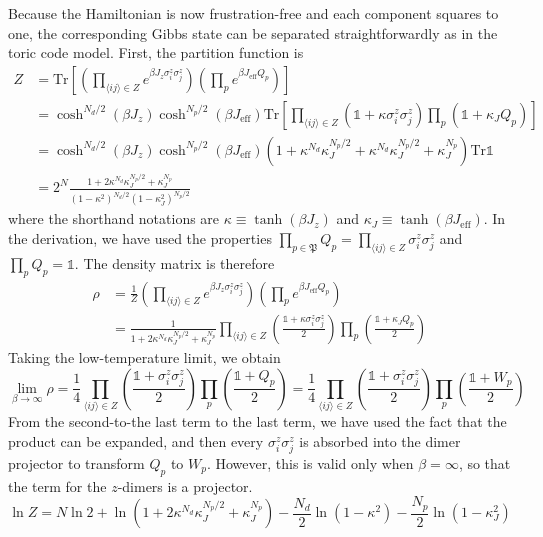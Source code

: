 \documentclass[12font]{article}
\numberwithin{equation}{section}    %
\theoremstyle{definition}
\newcommand{\anglelr}[1]{\langle #1 \rangle}
\newcommand{\lr}[1]{\left(  #1  \right)}
\newcommand{\lrm}[1]{\left[  #1  \right]}
\newcommand{\mrm}[1]{\mathrm{#1}}
\newcommand{\Tr}{\mrm{Tr}}
\begin{document}
Because the Hamiltonian is now frustration-free and each component squares to one, the corresponding Gibbs state can be separated straightforwardly as in the toric code model. First, the partition function is
\begin{align}
    Z 
    &= 
    \Tr
    \lrm{
    \lr{\prod_{\anglelr{ij}\in Z} e^{\beta J_z \sigma^z_i\sigma^z_j}}
    \lr{\prod_p e^{\beta J_{\mrm{eff}} Q_p}} 
    } \nonumber \\
    &= 
    \cosh^{N_d/2}(\beta J_z )
    \cosh^{N_p/2}(\beta J_{\mrm{eff}})
    \Tr\lrm{
    \prod_{\anglelr{ij}\in Z} \lr{\mathds{1} + \kappa \sigma^z_i\sigma^z_j}
    \prod_{p} \lr{\mathds{1} + \kappa_J Q_p} 
    } \nonumber \\
    &=
    \cosh^{N_d/2}(\beta J_z )
    \cosh^{N_p/2}(\beta J_{\mrm{eff}})
    \lr{
    1 + \kappa^{N_d}\kappa_J^{N_p/2} + \kappa^{N_d}\kappa_J^{N_p/2} + \kappa_J^{N_p}
    }
    \Tr\mathds{1} \nonumber \\
    &=
    2^N
    \frac
    {1 + 2\kappa^{N_d}\kappa_J^{N_p/2} +  \kappa_J^{N_p}}
    {\lr{1 - \kappa^2}^{N_d/2} \lr{1 - \kappa_J^2}^{N_p/2}}
\end{align}
where the shorthand notations are $\kappa \equiv \tanh(\beta J_z )$ and $\kappa_J \equiv \tanh(\beta J_{\mrm{eff}})$. In the derivation, we have used the properties $\prod_{p\in\mathfrak{P}} Q_p = \prod_{\anglelr{ij}\in Z}\sigma^z_i\sigma^z_j$ and $\prod_{p}Q_p = \mathds{1}$. The density matrix is therefore
\begin{align}\label{eq:kitaev-DM-finite-T}
    \rho 
    &= 
    \frac{1}{Z} \lr{\prod_{\anglelr{ij}\in Z} e^{\beta J_z \sigma^z_i\sigma^z_j}}
    \lr{\prod_p e^{\beta J_{\mrm{eff}} Q_p}} \nonumber \\
    &=
    \frac{1}{1 + 2\kappa^{N_d}\kappa_J^{N_p/2} + \kappa_J^{N_p}}
    \prod_{\anglelr{ij} \in Z} \lr{\frac{\mathds{1} + \kappa \sigma^z_i\sigma^z_j}{2}}
    \prod_{p}\lr{\frac{\mathds{1} + \kappa_J Q_p}{2}} 
\end{align}
Taking the low-temperature limit, we obtain
\[
\lim_{\beta\to\infty}\rho
=
\frac{1}{4}\prod_{\anglelr{ij} \in Z} \lr{\frac{\mathds{1} + \sigma^z_i\sigma^z_j}{2}}
    \prod_{p}\lr{\frac{\mathds{1} + Q_p}{2}} 
=
\frac{1}{4}\prod_{\anglelr{ij} \in Z} \lr{\frac{\mathds{1} + \sigma^z_i\sigma^z_j}{2}}
    \prod_{p}\lr{\frac{\mathds{1} + W_p}{2}} 
\]
From the second-to-the last term to the last term, we have used the fact that the product can be expanded, and then every $\sigma^z_i\sigma^z_j$ is absorbed into the dimer projector to transform $Q_p$ to $W_p$. However, this is valid only when $\beta = \infty$, so that the term for the $z$-dimers is a projector.
\[
\ln Z = N\ln 2
    +
    \ln\lr{
    1 + 2\kappa^{N_d}\kappa_J^{N_p/2} + \kappa_J^{N_p}
    }
    -
    \frac{N_d}{2} \ln\lr{1 - \kappa^2}
    -
    \frac{N_p}{2}
    \ln\lr{1 - \kappa_J^2}
\]
\end{document}
